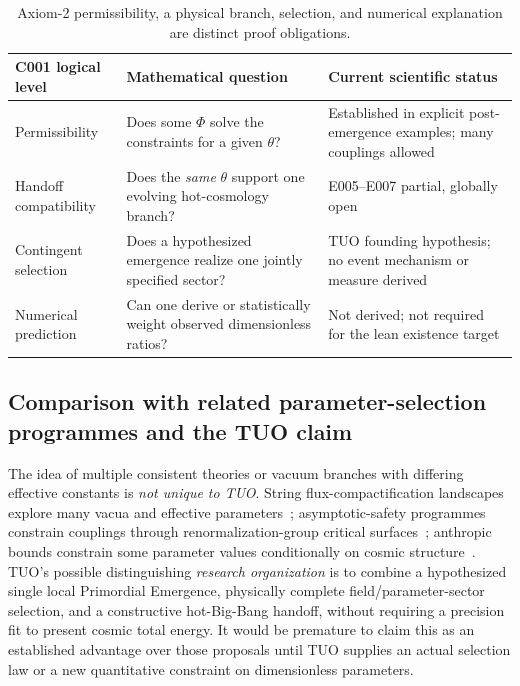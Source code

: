 \documentclass[11pt,a4paper]{article}
\theoremstyle{tmon}
\theoremstyle{definition}
\begin{document}
\begin{table}[htbp]\centering\small
\begin{tabularx}{\linewidth}{@{}p{.25\linewidth}YY@{}}\toprule
\textbf{C001 logical level}&\textbf{Mathematical question}&\textbf{Current scientific status}\\\midrule
Permissibility & Does some $\Phi$ solve the constraints for a given $\theta$? & Established in explicit post-emergence examples; many couplings allowed\\
Handoff compatibility & Does the \emph{same} $\theta$ support one evolving hot-cosmology branch? & E005--E007 partial, globally open\\
Contingent selection & Does a hypothesized emergence realize one jointly specified sector? & TUO founding hypothesis; no event mechanism or measure derived\\
Numerical prediction & Can one derive or statistically weight observed dimensionless ratios? & Not derived; not required for the lean existence target\\
\bottomrule\end{tabularx}
\caption{Axiom-2 permissibility, a physical branch, selection, and numerical explanation are distinct proof obligations.}\label{tab:c001levels}
\end{table}

\subsection{Comparison with related parameter-selection programmes and the TUO claim}
The idea of multiple consistent theories or vacuum branches with differing effective constants is \emph{not unique to TUO}. String flux-compactification landscapes explore many vacua and effective parameters~\cite{FluxLandscape}; asymptotic-safety programmes constrain couplings through renormalization-group critical surfaces~\cite{AsymSafe2024}; anthropic bounds constrain some parameter values conditionally on cosmic structure~\cite{Weinberg1987}. TUO's possible distinguishing \emph{research organization} is to combine a hypothesized single local Primordial Emergence, physically complete field/parameter-sector selection, and a constructive hot-Big-Bang handoff, without requiring a precision fit to present cosmic total energy. It would be premature to claim this as an established advantage over those proposals until TUO supplies an actual selection law or a new quantitative constraint on dimensionless parameters.
\end{document}
